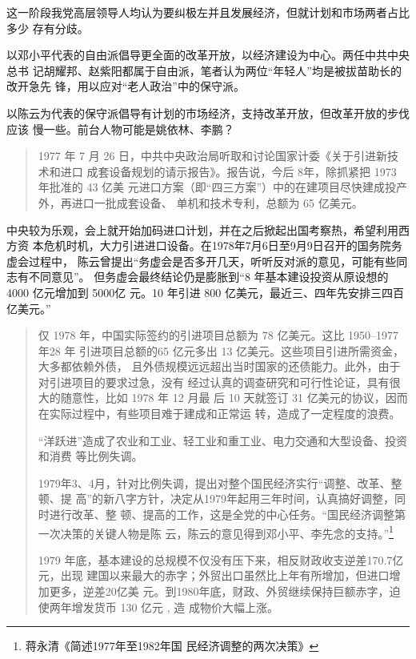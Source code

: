 

这一阶段我党高层领导人均认为要纠极左并且发展经济，但就计划和市场两者占比多少
存有分歧。

以邓小平代表的自由派倡导更全面的改革开放，以经济建设为中心。两任中共中央总书
记胡耀邦、赵紫阳都属于自由派，笔者认为两位“年轻人”均是被拔苗助长的改开急先
锋，用以应对“老人政治”中的保守派。

以陈云为代表的保守派倡导有计划的市场经济，支持改革开放，但改革开放的步伐应该
慢一些。前台人物可能是姚依林、李鹏？

\begin{quotation}
  1977 年 7 月 26 日，中共中央政治局听取和讨论国家计委《关于引进新技术和进口
  成套设备规划的请示报告》。报告说，今后 8年，除抓紧把 1973 年批准的 43 亿美
  元进口方案（即“四三方案”）中的在建项目尽快建成投产外，再进口一批成套设备、
  单机和技术专利，总额为 65 亿美元。\cite{yangyuejin}
\end{quotation}
中央较为乐观，会上就开始加码进口计划，并在之后掀起出国考察热，希望利用西方资
本危机时机，大力引进进口设备。在1978年7月6日至9月9日召开的国务院务虚会过程中，
陈云曾提出“务虚会是否多开几天，听听反对派的意见，可能有些同志有不同意见”。
但务虚会最终结论仍是膨胀到“8 年基本建设投资从原设想的 4000 亿元增加到 5000亿
元。10 年引进 800 亿美元，最近三、四年先安排三四百亿美元。”
\begin{quotation}
  仅 1978 年，中国实际签约的引进项目总额为 78 亿美元。这比 1950--1977年28 年
  引进项目总额的65 亿元多出 13 亿美元。这些项目引进所需资金，大多都依赖外债，
  且外债规模远远超出当时国家的还债能力。此外，由于对引进项目的要求过急，没有
  经过认真的调查研究和可行性论证，具有很大的随意性，比如 1978 年 12 月最
  后 10 天就签订 31 亿美元的协议，因而在实际过程中，有些项目难于建成和正常运
  转，造成了一定程度的浪费。\cite{yangyuejin}

  “洋跃进”造成了农业和工业、轻工业和重工业、电力交通和大型设备、投资和消费
  等比例失调。

  1979年3、4月，针对比例失调，提出对整个国民经济实行“调整、改革、整顿、提
  高”的新八字方针，决定从1979年起用三年时间，认真搞好调整，同时进行改革、整
  顿、提高的工作，这是全党的中心任务。“国民经济调整第一次决策的关键人物是陈
  云，陈云的意见得到邓小平、李先念的支持。”\footnote{蒋永清\quad 《简述1977年至1982年国
    民经济调整的两次决策》}

  1979 年底，基本建设的总规模不仅没有压下来，相反财政收支逆差170.7亿元，出现
  建国以来最大的赤字；外贸出口虽然比上年有所增加，但进口增加更多，逆差20亿美
  元。到1980年底，财政、外贸继续保持巨额赤字，迫使两年增发货币 130 亿元 , 造
  成物价大幅上涨。\cite{chenyunjihua}
\end{quotation}

